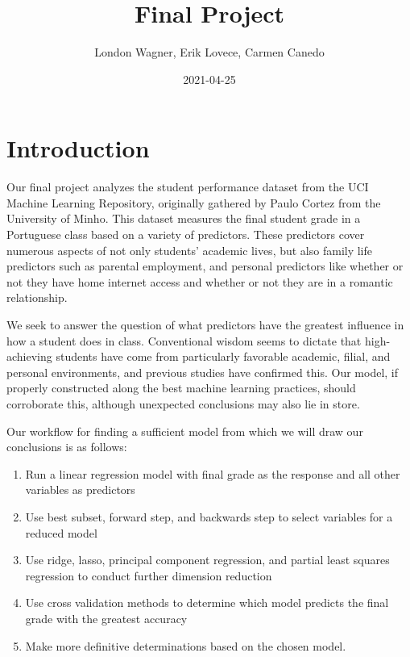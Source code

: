 \documentclass[
]{article}
\title{Final Project}
\author{London Wagner, Erik Lovece, Carmen Canedo}
\date{2021-04-25}
\providecommand{\tightlist}{%
  \setlength{\itemsep}{0pt}\setlength{\parskip}{0pt}}
\begin{document}
\maketitle

\hypertarget{introduction}{%
\section{Introduction}\label{introduction}}

Our final project analyzes the student performance dataset from the UCI
Machine Learning Repository, originally gathered by Paulo Cortez from
the University of Minho. This dataset measures the final student grade
in a Portuguese class based on a variety of predictors. These predictors
cover numerous aspects of not only students' academic lives, but also
family life predictors such as parental employment, and personal
predictors like whether or not they have home internet access and
whether or not they are in a romantic relationship.

We seek to answer the question of what predictors have the greatest
influence in how a student does in class. Conventional wisdom seems to
dictate that high-achieving students have come from particularly
favorable academic, filial, and personal environments, and previous
studies have confirmed this. Our model, if properly constructed along
the best machine learning practices, should corroborate this, although
unexpected conclusions may also lie in store.

Our workflow for finding a sufficient model from which we will draw our
conclusions is as follows:

\begin{enumerate}
\def\labelenumi{\arabic{enumi})}
\tightlist
\item
  Run a linear regression model with final grade as the response and all
  other variables as predictors
\item
  Use best subset, forward step, and backwards step to select variables
  for a reduced model
\item
  Use ridge, lasso, principal component regression, and partial least
  squares regression to conduct further dimension reduction
\item
  Use cross validation methods to determine which model predicts the
  final grade with the greatest accuracy
\item
  Make more definitive determinations based on the chosen model.
\end{enumerate}
\end{document}
